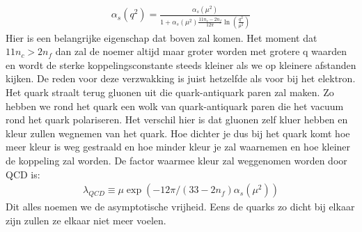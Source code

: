 \documentclass[../main.tex]{subfiles}
\begin{document}
\begin{equation}
    \begin{aligned}
        \label{eq:running_strong}
        \alpha_s(q^2) = \frac{\alpha_s(\mu^2)}{1+\alpha_s(\mu^2) \frac{11n_c-2n_f}{12\pi} \ln\left(\frac{q^2}{\mu^2}\right)} 
    \end{aligned}
\end{equation}
 Hier is een belangrijke eigenschap dat boven zal komen. Het moment dat $11n_c>2n_f$ dan zal de noemer altijd maar groter worden met grotere q waarden en wordt de sterke koppelingsconstante steeds kleiner als we op kleinere afstanden kijken. De reden voor deze verzwakking is juist hetzelfde als voor bij het elektron. Het quark straalt terug gluonen uit die quark-antiquark paren zal maken. Zo hebben we rond het quark een wolk van quark-antiquark paren die het vacuum rond het quark polariseren. Het verschil hier is dat gluonen zelf kluer hebben en kleur zullen wegnemen van het quark. Hoe dichter je dus bij het quark komt hoe meer kleur is weg gestraald en hoe minder kleur je zal waarnemen en hoe kleiner de koppeling zal worden. De factor waarmee kleur zal weggenomen worden door QCD is:
\begin{equation}
    \begin{aligned}
        \label{eq:kleur_qcd}
        \lambda_{QCD} \equiv \mu \exp(-12\pi/(33-2n_f)\alpha_s(\mu^2))
    \end{aligned}
\end{equation}
Dit alles noemen we de asymptotische vrijheid. Eens de quarks zo dicht bij elkaar zijn zullen ze elkaar niet meer voelen.
\end{document}
